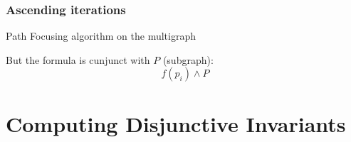 \documentclass{beamer}
\begin{document}
\begin{frame}
	\frametitle{Ascending iterations}

	Path Focusing algorithm on the multigraph

	\vspace{1cm}	

	But the formula is cunjunct with $P$ (subgraph): 
	$$f(p_i) \wedge P$$

	\vspace{1cm}
\end{frame}

%
%

\section{Computing Disjunctive Invariants}
\end{document}
